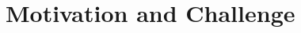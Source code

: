 \eat{
\subsection{}
\footnote{}
\emph{}
\texttt{} 
~\cite{}
~\ref{sec:}

}


\section{Motivation and Challenge}
\label{sec:moch}

% 
% 

